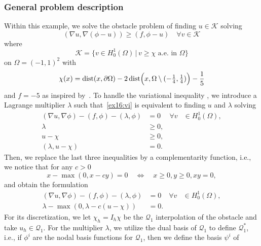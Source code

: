 \subsubsection{General problem description}
Within this example, we solve the obstacle problem
of finding $u \in \mathcal K$ solving 
\begin{equation}\label{ex16:vi}
  (\nabla u, \nabla (\phi-u)) \ge (f,\phi-u) \quad \forall v \in
  \mathcal K
\end{equation}
where
\[
  \mathcal K = \{v \in H^1_0(\Omega)\,|\, v \ge \chi \text{ a.e. in }\Omega\}
\]
on $\Omega = (-1,1)^2$ with
\[
 \chi(x) = \operatorname{dist}(x,\partial \Omega) - 2
 \operatorname{dist}\Bigl(x,\Omega \setminus (-\tfrac{1}{4},\tfrac{1}{4})\Bigr) -\frac{1}{5}
\]
and $f = -5$ as inspired
by~\cite[Example~7.5]{NochettoSiebertVeeser:2003}.
To handle the variational inequality ,
we introduce a Lagrange multiplier $\lambda$ such that~\eqref{ex16:vi}
is equivalent to finding $u$ and $\lambda$ solving 
\begin{equation}\label{ex16:lagrange}
  \begin{aligned}
    (\nabla u, \nabla \phi) - (f,\phi) - (\lambda,\phi) &= 0 & \forall
    v &\in H^1_0(\Omega),\\
    \lambda & \ge 0,\\
    u-\chi & \ge 0,\\
    (\lambda,u-\chi) &=0.
  \end{aligned}
\end{equation}
Then, we replace the last three inequalities by a complementarity
function, i.e., we notice that for any $c > 0$ 
\[
  x-\max(0,x-cy) = 0 \quad\Leftrightarrow \quad x \ge 0, y \ge 0, xy
  = 0,
\]
and obtain the formulation
\begin{equation}\label{ex16:complementarity}
  \begin{aligned}
    (\nabla u, \nabla \phi) - (f,\phi) - (\lambda,\phi) &= 0 & \forall
    v &\in H^1_0(\Omega),\\
    \lambda - \max(0,\lambda-c(u-\chi)) &= 0.
  \end{aligned}
\end{equation}
For its discretization, we let $\chi_h = I_h \chi$ be the $\mathcal
Q_1$ interpolation of the obstacle and take $u_h \in \mathcal Q_1$.
For the multiplier $\lambda$, we utilize the dual basis of $\mathcal
Q_1$ to define $\mathcal Q_1^*$, i.e., if $\phi^i$ are the nodal basis
functions for $\mathcal Q_1$, then we define the basis $\psi^i$ of
